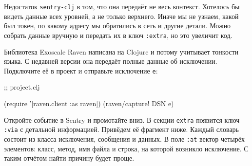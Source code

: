 Недостаток \verb|sentry-clj| в том, что она передаёт не весь
контекст. Хотелось бы видеть данные всех уровней, а не только верхнего. Иначе мы
не узнаем, какой был токен, по какому адресу мы обратились в сеть и другие
детали. Можно собрать данные вручную и передать их в ключ \verb|:extra|, но это
увеличит код.


Библиотека Exoscale Raven написана на Clojure и потому учитывает тонкости
языка. С недавней версии она передаёт полные данные об
исключении. Подключите её в проект и отправьте исключение \verb|e|:

\begin{english}
  \begin{clojure}
 ;; project.clj

(require '[raven.client :as raven])
(raven/capture! DSN e)
  \end{clojure}
\end{english}


Откройте событие в Sentry и промотайте вниз. В секции \verb|extra| появится ключ
\verb|:via| с детальной информацией. Привёдем её фрагмент ниже. Каждый словарь
состоит из класса исключения, сообщения и данных. В поле \verb|:at| вектор
четырёх элементов: класс, метод, имя файла и строка, на которой возникло
исключение. С таким отчётом найти причину будет проще.


\ifnarrow

\begin{english}
  \begin{json}
  \end{json}
\end{english}

\else

\iflarge

\begin{english}
  \begin{json}
  \end{json}
\end{english}

